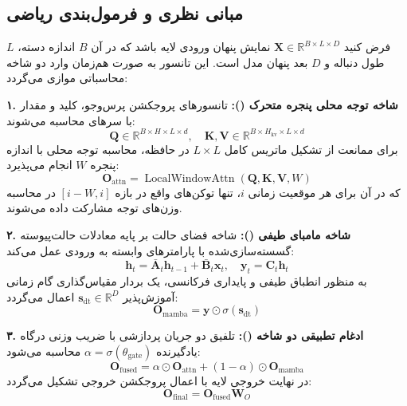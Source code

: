 \subsection{مبانی نظری و فرمول‌بندی ریاضی}
فرض کنید $\mathbf{X} \in \mathbb{R}^{B \times L \times D}$ نمایش پنهان ورودی لایه باشد که در آن $B$ اندازه دسته، $L$ طول دنباله و $D$ بعد پنهان مدل است. این تانسور به صورت هم‌زمان وارد دو شاخه محاسباتی موازی می‌گردد:

\textbf{۱. شاخه توجه محلی پنجره متحرک ():}
تانسورهای پروجکشن پرس‌وجو، کلید و مقدار با سرهای  محاسبه می‌شوند:
\begin{equation}
\mathbf{Q} \in \mathbb{R}^{B \times H \times L \times d}, \quad \mathbf{K}, \mathbf{V} \in \mathbb{R}^{B \times H_{\text{kv}} \times L \times d}
\end{equation}
برای ممانعت از تشکیل ماتریس کامل $L \times L$ در حافظه، محاسبه توجه محلی با اندازه پنجره $W$ انجام می‌پذیرد:
\begin{equation}
\mathbf{O}_{\text{attn}} = \operatorname{LocalWindowAttn}(\mathbf{Q}, \mathbf{K}, \mathbf{V}, W)
\end{equation}
که در آن برای هر موقعیت زمانی $i$، تنها توکن‌های واقع در بازه $[i-W, i]$ در محاسبه وزن‌های توجه مشارکت داده می‌شوند.

\textbf{۲. شاخه مامبای طیفی ():}
شاخه فضای حالت بر پایه معادلات حالت‌پیوسته گسسته‌سازی‌شده با پارامترهای وابسته به ورودی عمل می‌کند:
\begin{equation}
\mathbf{h}_t = \mathbf{\bar{A}}_t \mathbf{h}_{t-1} + \mathbf{\bar{B}}_t \mathbf{x}_t, \quad \mathbf{y}_t = \mathbf{C}_t \mathbf{h}_t
\end{equation}
به منظور انطباق طیفی و پایداری فرکانسی، یک بردار مقیاس‌گذاری گام زمانی آموزش‌پذیر $\mathbf{s}_{\text{dt}} \in \mathbb{R}^D$ اعمال می‌گردد:
\begin{equation}
\mathbf{O}_{\text{mamba}} = \mathbf{y} \odot \sigma(\mathbf{s}_{\text{dt}})
\end{equation}

\textbf{۳. ادغام تطبیقی دو شاخه ():}
تلفیق دو جریان پردازشی با ضریب وزنی درگاه یادگیرنده $\alpha = \sigma(\theta_{\text{gate}})$ محاسبه می‌شود:
\begin{equation}
\mathbf{O}_{\text{fused}} = \alpha \odot \mathbf{O}_{\text{attn}} + (1 - \alpha) \odot \mathbf{O}_{\text{mamba}}
\end{equation}
در نهایت خروجی لایه با اعمال پروجکشن خروجی تشکیل می‌گردد:
\begin{equation}
\mathbf{O}_{\text{final}} = \mathbf{O}_{\text{fused}} \mathbf{W}_O
\end{equation}


